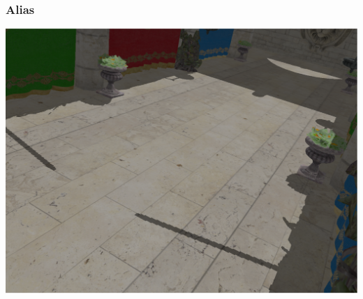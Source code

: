 \begin{frame}\frametitle{Alias}
  \includegraphics[width=\textwidth]{pics/shadows/shadowMapping/shadow_alias.eps}
\end{frame}

